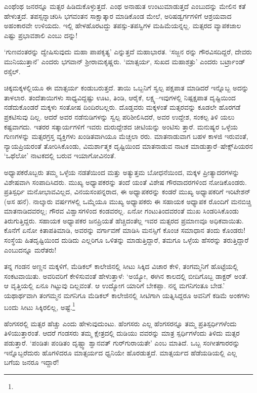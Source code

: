 ಎಂಥೆಂಥ ಜನರನ್ನೂ ಮತ್ಸರ ಹಿಡಿದುಕೊಳ್ಳುತ್ತದೆ. ಎಂಥ ಅನಾಹುತ ಉಂಟುಮಾಡುತ್ತದೆ ಎಂಬುದನ್ನು ಮೇಲಿನ ಕತೆ ಹೇಳುತ್ತದೆ. ತಪಸ್ಸನ್ನಾಚರಿಸಿ ಭಗವಂತನ ಸಾಕ್ಷಾತ್ಕಾರ ಮಾಡಿಕೊಂಡ ಮೇಲೆ, ಅರಿಷಡ್ವರ್ಗಗಳಿಗೆ ಆಶ್ರಯವಾದ ಅಹಂಕಾರವೇ ಉಳಿಯದು. ಇಲ್ಲಿ ಹೇಳಹೊರಟದ್ದು ತಪಸ್ಸು-ತಪಸ್ವಿಗಳ ಮಹಿಮೆಯನ್ನಲ್ಲ. ಮತ್ಸರದ ವ್ಯಾಪಕಜಾಲ ಎಷ್ಟು ಪ್ರಭಾವಶಾಲಿ ಎಂಬು ದನ್ನು!

‘ಗುಣವಂತರನ್ನು ದ್ವೇಷಿಸುವುದು ಮಹಾ ಪಾಪಕೃತ್ಯ’ ಎನ್ನುತ್ತದೆ ಮಹಾಭಾರತ. ‘ಸಜ್ಜನ ರನ್ನು ಗೌರವಿಸದಿದ್ದರೆ, ದೇವರು ಮುನಿಯುತ್ತಾನೆ’ ಎಂದರು ಭಗವಾನ್ ಶ‍್ರೀರಾಮಕೃಷ್ಣರು. ‘ಮಾತ್ಸರ್ಯ, ಸುಖದ ಮಹಾಶತ್ರು’ ಎಂದರು ಬರ್ಟ್ರಾಂಡ್ ರಸ್ಸೆಲ್.

ಚಿಕ್ಕಮಕ್ಕಳಲ್ಲಿಯೂ ಈ ಮಾತ್ಸರ್ಯ ಕಂಡುಬರುತ್ತದೆ. ತಾಯಿ ಒಬ್ಬನಿಗೆ ಸ್ವಲ್ಪ ಪಕ್ಷಪಾತ ಮಾಡಿದರೆ ಇನ್ನೊಬ್ಬ ಅದನ್ನು ತಾಳಲಾರ. ತಂದೆತಾಯಿಗಳು ಸಾಧ್ಯವಿದ್ದಷ್ಟು ಊಟ, ತಿಂಡಿ, ಆರೈಕೆ, ಲಕ್ಷ್ಯ–ಇವುಗಳಲ್ಲಿ ನಿಷ್ಪಕ್ಷಪಾತ ದೃಷ್ಟಿಯಿಂದ ನಡೆದುಕೊಂಡರೆ ಮಕ್ಕಳು ಸಂತೋಷ ದಿಂದಿರಬಲ್ಲರು. ದೊಡ್ಡವರು ಮಕ್ಕಳಂತೆ ಮತ್ಸರವನ್ನು ಕೂಡಲೇ ಹೊರಗಡೆ ಪ್ರಕಟಿಸುವು ದಿಲ್ಲ. ಆದರೆ ಅವರ ನಡೆನುಡಿಗಳನ್ನು ಸ್ವಲ್ಪ ಪರಿಶೀಲಿಸಿದರೆ, ಅವರ ಉದ್ದೇಶ, ಸಂಕಲ್ಪ ತಿಳಿ ಯಲು ಕಷ್ಟವಾಗದು. ಇತರರ ಸತ್ಕಾರ್ಯಗಳಿಗೆ ಇವರು ದುರುದ್ದೇಶದ ಚೀಟಿಯನ್ನು ಅಂಟಿಸು ತ್ತಾರೆ. ಮನುಷ್ಯರ ಒಳ್ಳೆಯ ಗುಣಗಳನ್ನು ಮತ್ಸರಗ್ರಸ್ತ ವ್ಯಕ್ತಿಗಳು ಖಂಡಿತವಾಗಿಯೂ ಮೆಚ್ಚಲಾ ರರು. ಮಾತನಾಡುವಾಗ ಬಹಳ ಕಾಳಜಿ ಇರುವಂತೆ, ನ್ಯಾಯಪ್ರಿಯರಂತೆ ತೋರಿಸಿಕೊಂಡು, ವಿಮರ್ಶಾತ್ಮಕ ದೃಷ್ಟಿಯಿಂದ ಮಾತನಾಡುವ ನಾಟಕ ಮಾಡುತ್ತಾರೆ–ಷೇಕ್ಸ್​ಪಿಯರನ ‘ಒಥೆಲೋ’ ನಾಟಕದಲ್ಲಿ ಬರುವ ಇಯಾಗೋವಿನಂತೆ.

ಅಧ್ಯಾಪಕರೊಬ್ಬರು ತಮ್ಮ ಒಳ್ಳೆಯ ನಡತೆಯಿಂದ ಮತ್ತು ಅತ್ಯುತ್ತಮ ಬೋಧನೆಯಿಂದ, ಮಕ್ಕಳ ಪ್ರೀತ್ಯಾದರಗಳನ್ನು ವಿಶೇಷವಾಗಿ ಸಂಪಾದಿಸಿದರು. ಮುಖ್ಯ ಅಧ್ಯಾಪಕರನ್ನು ತಂದೆ ಯಂತೆ ವಿಶೇಷ ಗೌರವಾದರಗಳಿಂದ ನೋಡಿಕೊಂಡರು. ಪ್ರತಿಸ್ಪರ್ಧಿ ಮನೋಭಾವವಿಲ್ಲದ, ವಿನಯಸಂಪನ್ನರಾದ, ಈ ಅಧ್ಯಾಪಕರನ್ನು ಕಂಡರೆ ಮುಖ್ಯ ಅಧ್ಯಾಪಕರಿಗೆ ಇರಿಟೇಶನ್ (ಅಸ ಹನೆ). ನಾಲ್ಕಾರು ವರ್ಷಗಳಲ್ಲಿ ಒಮ್ಮೆಯೂ ಮುಖ್ಯ ಅಧ್ಯಾಪಕರು ಈ ಸಹಾಯಕ ಅಧ್ಯಾಪಕ ರೊಂದಿಗೆ ಮನಬಿಚ್ಚಿ ಮಾತನಾಡಿದವರಲ್ಲ; ಗೌರವ ವಿಶ್ವಾಸಗಳಿಂದ ಕಂಡವರಲ್ಲ. ಏನೋ ಗಂಟುತಿಂದವರಂತೆ ಮುಖ ಸಿಂಡರಿಸಿಕೊಂಡು ತಿರುಗುತ್ತಿದ್ದರು. ಸಹಾಯಕ ಅಧ್ಯಾಪಕರ ಜನಪ್ರಿಯತೆ ಹೆಚ್ಚಿದಂತೆಲ್ಲ ಇವರ ಮತ್ಸರದ ಪ್ರಮಾಣವೂ ಅಧಿಕವಾಯಿತು. ಕೊನೆಗೆ ಏನೋ ಕಿತಾಪತಿಮಾಡಿ, ಅವರನ್ನು ವರ್ಗಾವಣೆ ಮಾಡಿಸಿ ಮನಸ್ಸಿಗೆ ಕೊಂಚ ಸಮಾಧಾನ ತಂದು ಕೊಂಡರು! ಸಂಸ್ಥೆಯ ಹಿತದೃಷ್ಟಿಯಿಂದ ದುಡಿದು ಎಲ್ಲರಿಗೂ ಒಳಿತನ್ನು ಮಾಡುತ್ತಿದ್ದಾರೆ, ತಮಗೂ ಒಳ್ಳೆಯ ಹೆಸರನ್ನು ತರುತ್ತಿದ್ದಾರೆ ಎಂಬುದನ್ನೂ ಮರೆತರು!

ತನ್ನ ಗಂಡನ ಅಣ್ಣನ ಮಕ್ಕಳಿಗೆ, ಮೆಡಿಕಲ್ ಕಾಲೇಜಿನಲ್ಲಿ ಸೀಟು ಸಿಕ್ಕಿದ ವಿಚಾರ ಕೇಳಿ, ತಂಗಮ್ಮನಿಗೆ ಹೊಟ್ಟೆಯಲ್ಲಿ ಸಂಕಟವಾಯಿತು. ಅವರಿವರಿಗೆ ಕೇಳಿಸುವಂತೆ ಹೇಳುತ್ತಾಳೆ: ‘ಅಯ್ಯೋ, ಈಗಿನ ಕಾಲದಲ್ಲಿ ಬೀದಿಗೊಬ್ಬ ಡಾಕ್ಟರ್ ಅಂತೆ. ಆ ವೃತ್ತಿಯಲ್ಲಿ ಏನೂ ಗಿಟ್ಟುವು ದಿಲ್ಲವಂತೆ. ಆ ಉದ್ಯೋಗ ಯಾರಿಗೆ ಬೇಕಪ್ಪಾ. ನನ್ನ ಮಗನಿಗಂತೂ ಬೇಡ.’ ಯಥಾರ್ಥವಾಗಿ ತಂಗಮ್ಮನ ಮಗನಿಗೂ ಮೆಡಿಕಲ್ ಕಾಲೇಜಿನಲ್ಲಿ ಸೀಟಿಗಾಗಿ ಯತ್ನಿಸಿದ್ದರೂ ಅವನಿಗೆ ಕಡಿಮೆ ಅಂಕಗಳು ಬಂದು ಸೀಟು ಸಿಕ್ಕಿರಲಿಲ್ಲ, ಅಷ್ಟೆ.\footnote{}

ಹೆಂಗಸರಲ್ಲಿ ಮತ್ಸರ ಹೆಚ್ಚು ಎಂದು ಹೇಳುವುದುಂಟು. ಹೆಂಗಸರು ಎಲ್ಲ ಹೆಂಗಸರನ್ನೂ ತಮ್ಮ ಪ್ರತಿಸ್ಪರ್ಧಿಗಳೆಂದು ತಿಳಿಯುತ್ತಾರಂತೆ. ಆದರೆ ಗಂಡಸರು ತಮ್ಮ ಕ್ಷೇತ್ರದಲ್ಲಿ ದುಡಿಯು ವವರನ್ನು ಮಾತ್ರ ಸ್ಪರ್ಧಿಗಳೆಂದು ತಿಳಿದು ಮತ್ಸರ ಪಡುತ್ತಾರೆ. ‘ಪಂಡಿತಃ ಪಂಡಿತಂ ದೃಷ್ಟ್ವಾ ಶ್ವಾನವತ್ ಗುರ್​ಗುರಾಯತೇ’ ಎಂಬ ಮಾತಿದೆ. ಒಬ್ಬ ಸಂಗೀತಗಾರರನ್ನು ಇನ್ನೊಬ್ಬರೆದುರು ಹೊಗಳಿದರೂ ಮಾತ್ಸರ್ಯದ ಧ್ವನಿಯೇ ಹೊರಡುತ್ತದೆ. ಮಾತ್ಸರ್ಯದ ಹೆಡೆಯಡಿಯಲ್ಲಿ ಎಲ್ಲ ಬಗೆಯ ಜನರೂ ಇದ್ದಾರೆ!

